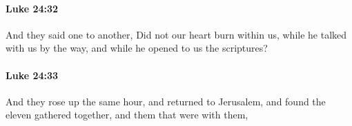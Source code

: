 		\paragraph{Luke 24:32} %
			\label{LUKE-24-32}

			And they said one to another, Did not our heart burn within us, while he talked with us by the way, and while he opened to us the scriptures?

			\begin{framed}
			\scriptsize
				\begin{compactdesc}
					\item[SBLG] 
				\end{compactdesc}
			\end{framed}

		\paragraph{Luke 24:33} %
			\label{LUKE-24-33}

			And they rose up the same hour, and returned to Jerusalem, and found the eleven gathered together, and them that were with them,

